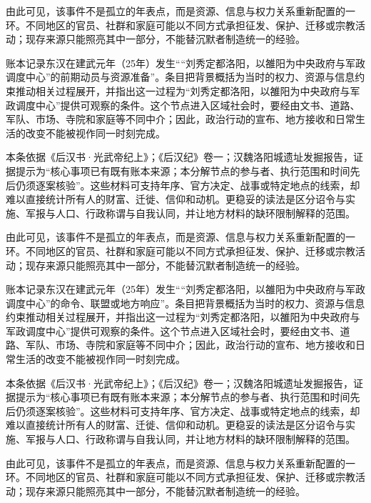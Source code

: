 由此可见，该事件不是孤立的年表点，而是资源、信息与权力关系重新配置的一环。不同地区的官员、社群和家庭可能以不同方式承担征发、保护、迁移或宗教活动；现存来源只能照亮其中一部分，不能替沉默者制造统一的经验。

账本记录东汉在建武元年（25年）发生““刘秀定都洛阳，以雒阳为中央政府与军政调度中心”的前期动员与资源准备”。条目把背景概括为当时的权力、资源与信息约束推动相关过程展开，并指出这一过程为“刘秀定都洛阳，以雒阳为中央政府与军政调度中心”提供可观察的条件。这个节点进入区域社会时，要经由文书、道路、军队、市场、寺院和家庭等不同中介；因此，政治行动的宣布、地方接收和日常生活的改变不能被视作同一时刻完成。

本条依据《后汉书·光武帝纪上》；《后汉纪》卷一；汉魏洛阳城遗址发掘报告，证据提示为“核心事项已有既有账本来源；本分解节点的参与者、执行范围和时间先后仍须逐案核验”。这些材料可支持年序、官方决定、战事或特定地点的线索，却难以直接统计所有人的财富、迁徙、信仰和动机。更稳妥的读法是区分诏令与实施、军报与人口、行政称谓与自我认同，并让地方材料的缺环限制解释的范围。

由此可见，该事件不是孤立的年表点，而是资源、信息与权力关系重新配置的一环。不同地区的官员、社群和家庭可能以不同方式承担征发、保护、迁移或宗教活动；现存来源只能照亮其中一部分，不能替沉默者制造统一的经验。

账本记录东汉在建武元年（25年）发生““刘秀定都洛阳，以雒阳为中央政府与军政调度中心”的命令、联盟或地方响应”。条目把背景概括为当时的权力、资源与信息约束推动相关过程展开，并指出这一过程为“刘秀定都洛阳，以雒阳为中央政府与军政调度中心”提供可观察的条件。这个节点进入区域社会时，要经由文书、道路、军队、市场、寺院和家庭等不同中介；因此，政治行动的宣布、地方接收和日常生活的改变不能被视作同一时刻完成。

本条依据《后汉书·光武帝纪上》；《后汉纪》卷一；汉魏洛阳城遗址发掘报告，证据提示为“核心事项已有既有账本来源；本分解节点的参与者、执行范围和时间先后仍须逐案核验”。这些材料可支持年序、官方决定、战事或特定地点的线索，却难以直接统计所有人的财富、迁徙、信仰和动机。更稳妥的读法是区分诏令与实施、军报与人口、行政称谓与自我认同，并让地方材料的缺环限制解释的范围。

由此可见，该事件不是孤立的年表点，而是资源、信息与权力关系重新配置的一环。不同地区的官员、社群和家庭可能以不同方式承担征发、保护、迁移或宗教活动；现存来源只能照亮其中一部分，不能替沉默者制造统一的经验。

